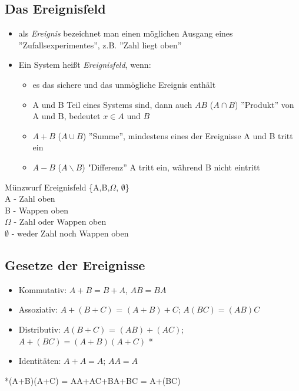 \subsection{Das Ereignisfeld}
\begin{itemize}
	\item als \textit{Ereignis} bezeichnet man einen möglichen Ausgang eines ''Zufallsexperimentes'', z.B. ''Zahl liegt oben''
	\item Ein System heißt \textit{Ereignisfeld}, wenn:
	\begin{itemize}
		\item es das sichere und das unmögliche Ereignis enthält

				\item A und B Teil eines Systems sind, dann auch $AB$ ($A\cap B$) ''Produkt'' von A und B, bedeutet $x \in A \text{ und } B$
			\item $A+B$ ($A \cup B$) ''Summe'', mindestens eines der Ereignisse A und B tritt ein
			\item $A-B$ ($A\backslash B$) "Differenz'' A tritt ein, während B nicht eintritt

	
	\end{itemize}
\end{itemize}
\begin{exmp}
	Münzwurf Ereignisfeld \{A,B,$\Omega$, $\emptyset$\}\\
	A - Zahl oben\\B - Wappen oben \\ $\Omega$ - Zahl oder Wappen oben \\ $\emptyset$ - weder Zahl noch Wappen oben
\end{exmp}

\subsection{Gesetze der Ereignisse}
\begin{itemize}
	\item Kommutativ: $A+B = B+A$, $AB = BA$
	\item Assoziativ: $A+(B+C)$ = $(A+B)+C$; $A(BC) = (AB)C$
	\item Distributiv: $A(B+C)$ = $(AB)+(AC)$; $A+(BC) = (A+B)(A+C)$ *
	\item Identitäten: $A+A = A$; $AA = A$
\end{itemize}
*(A+B)(A+C) = AA+AC+BA+BC = A+(BC)


